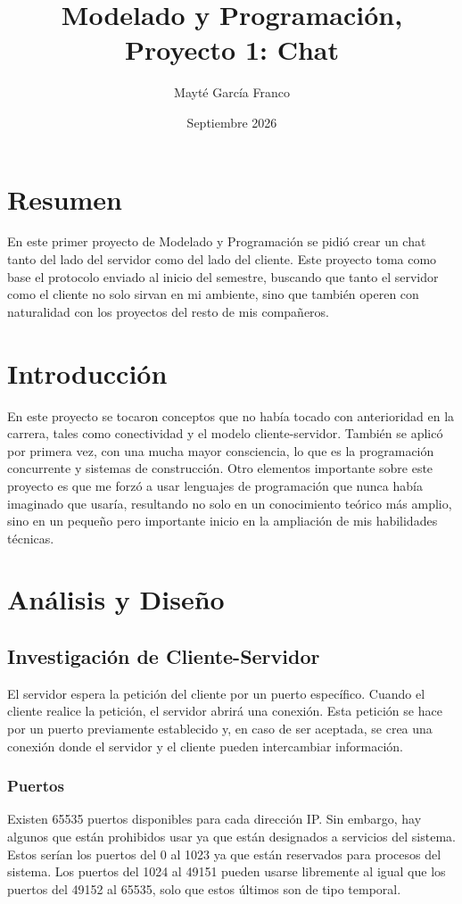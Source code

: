 \documentclass{article}
\title{Modelado y Programación, Proyecto 1: Chat}
\author{Mayté García Franco}
\date{Septiembre 2026}
\begin{document}
\maketitle

\section{Resumen}

En este primer proyecto de Modelado y Programación se pidió crear un chat tanto del lado del servidor como del lado del cliente. Este proyecto toma como base el protocolo enviado al inicio del semestre, buscando que tanto el servidor como el cliente no solo sirvan en mi ambiente, sino que también operen con naturalidad con los proyectos del resto de mis compañeros. 

\section{Introducción}

En este proyecto se tocaron conceptos que no había tocado con anterioridad en la carrera, tales como conectividad y el modelo cliente-servidor. También se aplicó por primera vez, con una mucha mayor consciencia, lo que es la programación concurrente y sistemas de construcción. Otro elementos importante sobre este proyecto es que me forzó a usar lenguajes de programación que nunca había imaginado que usaría, resultando no solo en un conocimiento teórico más amplio, sino en un pequeño pero importante inicio en la ampliación de mis habilidades técnicas. 

\section{Análisis y Diseño}

\subsection{Investigación de Cliente-Servidor}
El servidor espera la petición del cliente por un puerto específico. Cuando el cliente realice la petición, el servidor abrirá una conexión. Esta petición se hace por un puerto previamente establecido y, en caso de ser aceptada, se crea una conexión donde el servidor y el cliente pueden intercambiar información.

\subsubsection{Puertos}
Existen 65535 puertos disponibles para cada dirección IP. Sin embargo, hay algunos que están prohibidos usar ya que están designados a servicios del sistema. Estos serían los puertos del 0 al 1023 ya que están reservados para procesos del sistema. Los puertos del 1024 al 49151 pueden usarse libremente al igual que los puertos del 49152 al 65535, solo que estos últimos son de tipo temporal.
\end{document}
